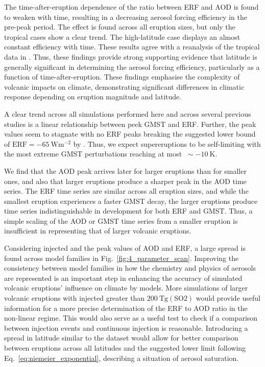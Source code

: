\documentclass[draft]{agujournal2019}
\begin{document}
  The time-after-eruption dependence of the ratio between ERF and AOD is found to weaken
  with time, resulting in a decreasing aerosol forcing efficiency in the pre-peak
  period. The effect is found across all eruption sizes, but only the tropical cases
  show a clear trend. The high-latitude case displays an almost constant efficiency with
  time. These results agree with a reanalysis of the tropical data in
  . Thus, these findings provide strong supporting evidence
  that latitude is generally significant in determining the aerosol forcing efficiency,
  particularly as a function of time-after-eruption. These findings emphasise the
  complexity of volcanic impacts on climate, demonstrating significant differences in
  climatic response depending on eruption magnitude and latitude.

  A clear trend across all simulations performed here and across several previous
  studies is a linear relationship between peek GMST and ERF. Further, the peak values
  seem to stagnate with no ERF peaks breaking the suggested lower bound of
  \(\text{ERF}=\SI{-65}{\watt\metre^{-2}}\) by . Thus, we expect
  supereruptions to be self-limiting with the most extreme GMST perturbations reaching
  at most \(~\sim \SI{-10}{\kelvin}\).

  We find that the AOD peak arrives later for larger eruptions than for smaller ones,
  and also that larger eruptions produce a sharper peak in the AOD time series. The ERF
  time series are similar across all eruption sizes, and while the smallest eruption
  experiences a faster GMST decay, the larger eruptions produce time series
  indistinguishable in development for both ERF and GMST. Thus, a simple scaling of the
  AOD or GMST time series from a smaller eruption is insufficient in representing that
  of larger volcanic eruptions.

  Considering injected  and the peak values of AOD and ERF, a large spread is
  found across model families in Fig.~\ref{fig:4_parameter_scan}. Improving the
  consistency between model families in how the chemistry and physics of aerosols are
  represented is an important step in enhancing the accuracy of simulated volcanic
  eruptions' influence on climate by models. More simulations of larger volcanic
  eruptions with injected  greater than \(\SI{200}{\tera\gram(\mathrm{SO2})}\)
  would provide useful information for a more precise determination of the ERF to AOD
  ratio in the non-linear regime. This would also serve as a useful test to check if a
  comparison between  injection events and continuous  injection is
  reasonable. Introducing a spread in latitude similar to the
   dataset would allow for better comparison between
  eruptions across all latitudes and the suggested lower limit following
  Eq.~\ref{eq:niemeier_exponential}, describing a situation of aerosol saturation.
\end{document}
